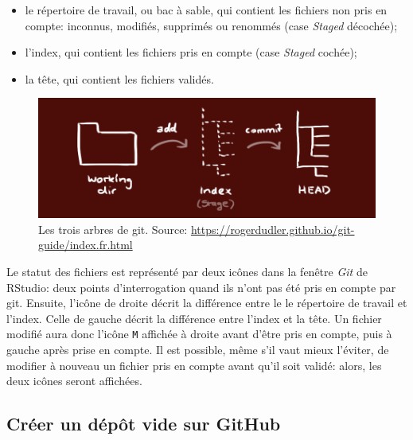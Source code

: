 \documentclass[
  11pt,
  french,
  a4paper,
  extrafontsizes,onecolumn,openright
  ]{memoir}
\providecommand{\tightlist}{%
  \setlength{\itemsep}{0pt}\setlength{\parskip}{0pt}}
\begin{document}
\begin{itemize}
\tightlist
\item
  le répertoire de travail, ou bac à sable, qui contient les fichiers non pris en compte: inconnus, modifiés, supprimés ou renommés (case \emph{Staged} décochée);
\item
  l'index, qui contient les fichiers pris en compte (case \emph{Staged} cochée);
\item
  la tête, qui contient les fichiers validés.
\end{itemize}



\scriptsize

\begin{figure}

{\centering \includegraphics[width=0.8\linewidth]{images/git-Trees} 

}

\caption{Les trois arbres de git. Source: \url{https://rogerdudler.github.io/git-guide/index.fr.html}}\label{fig:git-Trees}
\end{figure}

\normalsize

Le statut des fichiers est représenté par deux icônes dans la fenêtre \emph{Git} de RStudio: deux points d'interrogation quand ils n'ont pas été pris en compte par git.
Ensuite, l'icône de droite décrit la différence entre le le répertoire de travail et l'index.
Celle de gauche décrit la différence entre l'index et la tête.
Un fichier modifié aura donc l'icône \texttt{M} affichée à droite avant d'être pris en compte, puis à gauche après prise en compte.
Il est possible, même s'il vaut mieux l'éviter, de modifier à nouveau un fichier pris en compte avant qu'il soit validé: alors, les deux icônes seront affichées.

\hypertarget{cruxe9er-un-duxe9puxf4t-vide-sur-github}{%
\subsection{Créer un dépôt vide sur GitHub}\label{cruxe9er-un-duxe9puxf4t-vide-sur-github}}
\end{document}
